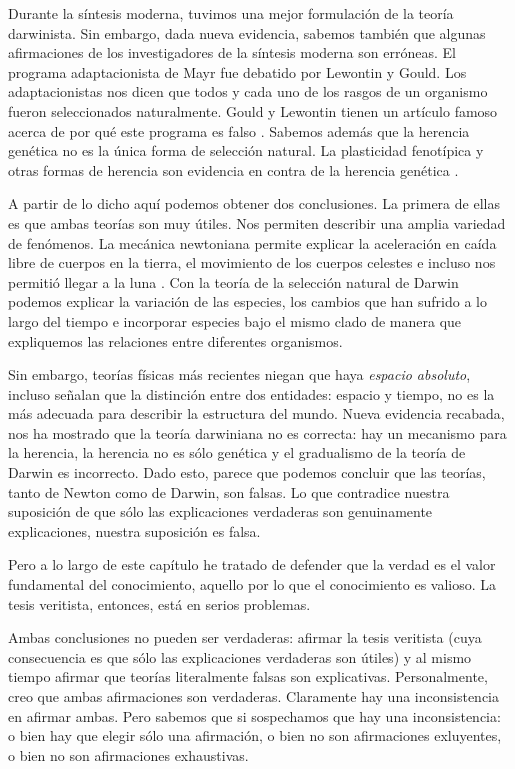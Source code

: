 Durante la síntesis moderna, tuvimos una mejor formulación de la teoría darwinista.
Sin embargo, dada nueva evidencia, sabemos también que algunas afirmaciones de los investigadores de la síntesis moderna son erróneas. 
El programa adaptacionista de Mayr fue debatido por Lewontin y Gould.
Los adaptacionistas nos dicen que todos y cada uno de los rasgos de un organismo fueron seleccionados naturalmente.
Gould y Lewontin tienen un artículo famoso acerca de por qué este programa es falso \parencite{gould1979}.
Sabemos además que la herencia genética no es la única forma de selección natural.
La plasticidad fenotípica y otras formas de herencia son evidencia en contra de la herencia genética \parencite{uller2019}. 

A partir de lo dicho aquí podemos obtener dos conclusiones.
La primera de ellas es que ambas teorías son muy útiles.
Nos permiten describir una amplia variedad de fenómenos. 
La mecánica newtoniana permite explicar la aceleración en caída libre de cuerpos en la tierra, el movimiento de los cuerpos celestes e incluso nos permitió llegar a la luna \parencite{nasa}.
Con la teoría de la selección natural de Darwin podemos explicar la variación de las especies, los cambios que han sufrido a lo largo del tiempo e incorporar especies bajo el mismo clado de manera que expliquemos las relaciones entre diferentes organismos.

Sin embargo, teorías físicas más recientes niegan que haya \emph{espacio absoluto}, incluso señalan que la distinción entre dos entidades: espacio y tiempo, no es la más adecuada para describir la estructura del mundo.
Nueva evidencia recabada, nos ha mostrado que la teoría darwiniana no es correcta: hay un mecanismo para la herencia, la herencia no es sólo genética y el gradualismo de la teoría de Darwin es incorrecto.
Dado esto, parece que podemos concluir que las teorías, tanto de Newton como de Darwin, son falsas.
Lo que contradice nuestra suposición de que sólo las explicaciones verdaderas son genuinamente explicaciones, nuestra suposición es falsa.

Pero a lo largo de este capítulo he tratado de defender que la verdad es el valor fundamental del conocimiento, aquello por lo que el conocimiento es valioso.
La tesis veritista, entonces, está en serios problemas.

Ambas conclusiones no pueden ser verdaderas: afirmar la tesis veritista (cuya consecuencia es que sólo las explicaciones verdaderas son útiles) y al mismo tiempo afirmar que teorías literalmente falsas son explicativas.
Personalmente, creo que ambas afirmaciones son verdaderas. 
Claramente hay una inconsistencia en afirmar ambas.
Pero sabemos que si sospechamos que hay una inconsistencia: o bien hay que elegir sólo una afirmación, o bien no son afirmaciones exluyentes, o bien no son afirmaciones exhaustivas. 

